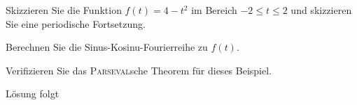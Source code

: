 \documentclass{atistandalonetask}
\begin{document}
  \begin{atiTask}[
    title = Periodische Fortsetzung
  ]


	\begin{atiSubtasks}
		\item Skizzieren Sie die Funktion $f(t)=4-t^2$ im Bereich $-2\leq t\leq 2$ und skizzieren Sie eine periodische Fortsetzung.
		\item Berechnen Sie die Sinus-Kosinu-Fourierreihe zu $f(t)$.
		\item Verifizieren Sie das \textsc{Parseval}sche Theorem für dieses Beispiel.
	\end{atiSubtasks} 
	\atiNote{\[\sum _{n=1}^\infty\frac{1}{n^4}=\frac{\pi^4}{90}\]}
  \end{atiTask}
  \begin{atiSolution}
  Lösung folgt
  \end{atiSolution}
\end{document}
